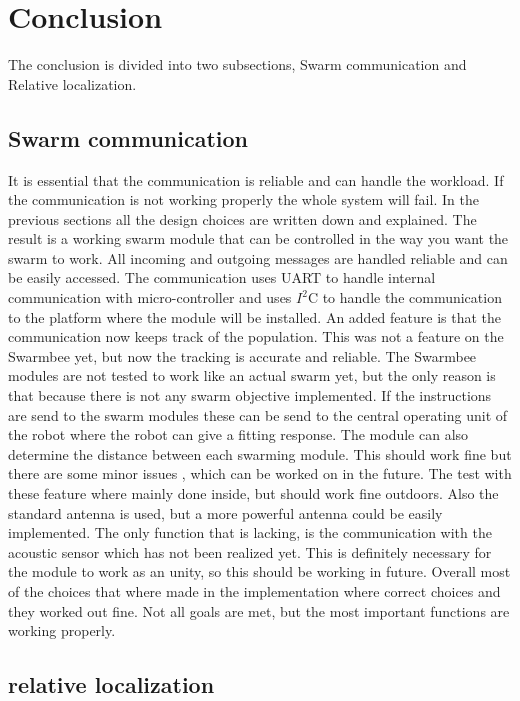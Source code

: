 \documentclass[10pt,a4paper]{article}
\begin{document}
\section{Conclusion}
The conclusion is divided into two subsections, Swarm communication and Relative localization. 

\subsection{Swarm communication}
It is essential that the communication is reliable and can handle the workload. If the communication is not working properly the whole system will fail. In the previous sections all the design choices are written down and explained. The result is a working swarm module that can be controlled in the way you want the swarm to work. All incoming and outgoing messages are handled reliable and can be easily accessed. The communication uses UART to handle internal communication with micro-controller and uses $I^2$C to handle the communication to the platform where the module will be installed. An added feature is that the communication now keeps track of the population. This was not a feature on the Swarmbee yet, but now the tracking is accurate and reliable. The Swarmbee modules are not tested to work like an actual swarm yet, but the only reason is that because there is not any swarm objective implemented. If the instructions are send to the swarm modules these can be send to the central operating unit of the robot where the robot can give a fitting response. The module can also determine the distance between each swarming module. This should work fine but there are some minor issues , which can be worked on in the future. The test with these feature where mainly done inside, but should work fine outdoors. Also the standard antenna is used, but a more powerful antenna could be easily implemented. The only function that is lacking, is the communication with the acoustic sensor which has not been realized yet. This is definitely necessary for the module to work as an unity, so this should be working in future. Overall most of the choices that where made in the implementation where correct choices and they worked out fine. Not all goals are met, but the most important functions are working properly.

\subsection{relative localization} 
\end{document}
